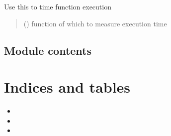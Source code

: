 \documentclass[letterpaper,10pt,english]{sphinxmanual}
\begin{document}

\begin{fulllineitems}
\label{\detokenize{micropolarray:micropolarray.utils.sigma_DN}}
\pysigstartsignatures
{}
\pysigstopsignatures
\end{fulllineitems}


\begin{fulllineitems}
\label{\detokenize{micropolarray:micropolarray.utils.timer}}
\pysigstartsignatures
{}
\pysigstopsignatures
\sphinxAtStartPar
Use this to time function execution
\begin{quote}\begin{description}
\sphinxAtStartPar
{} () \textendash{} function of which to measure execution time

\end{description}\end{quote}

\end{fulllineitems}



\section{Module contents}
\label{\detokenize{micropolarray:module-micropolarray}}\label{\detokenize{micropolarray:module-contents}}

\chapter{Indices and tables}
\label{\detokenize{index:indices-and-tables}}\begin{itemize}
\item {} 
\sphinxAtStartPar
{}

\item {} 
\sphinxAtStartPar
{}

\item {} 
\sphinxAtStartPar
{}

\end{itemize}
\end{document}
